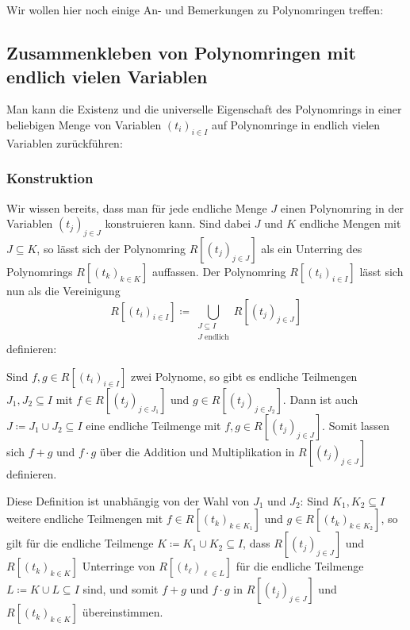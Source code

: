 \section{}

Wir wollen hier noch einige An- und Bemerkungen zu Polynomringen treffen:





\subsection*{Zusammenkleben von Polynomringen mit endlich vielen Variablen}

Man kann die Existenz und die universelle Eigenschaft des Polynomrings in einer beliebigen Menge von Variablen $(t_i)_{i \in I}$ auf Polynomringe in endlich vielen Variablen zurückführen:



\subsubsection*{Konstruktion}

Wir wissen bereits, dass man für jede endliche Menge $J$ einen Polynomring in der Variablen $(t_j)_{j \in J}$ konstruieren kann.
Sind dabei $J$ und $K$ endliche Mengen mit $J \subseteq K$, so lässt sich der Polynomring $R[(t_j)_{j \in J}]$ als ein Unterring des Polynomrings $R[(t_k)_{k \in K}]$ auffassen.
Der Polynomring $R[(t_i)_{i \in I}]$ lässt sich nun als die Vereinigung
\[
            R[(t_i)_{i \in I}]
  \coloneqq \bigcup_{\substack{J \subseteq I \\ \text{$J$ endlich}}} R[(t_j)_{j \in J}]
\]
definieren:

Sind $f, g \in R[(t_i)_{i \in I}]$ zwei Polynome, so gibt es endliche Teilmengen $J_1, J_2 \subseteq I$ mit $f \in R[(t_j)_{j \in J_1}]$ und $g \in R[(t_j)_{j \in J_2}]$.
Dann ist auch $J \coloneqq J_1 \cup J_2 \subseteq I$ eine endliche Teilmenge mit $f, g \in R[(t_j)_{j \in J}]$.
Somit lassen sich $f + g$ und $f \cdot g$ über die Addition und Multiplikation in $R[(t_j)_{j \in J}]$ definieren.

Diese Definition ist unabhängig von der Wahl von $J_1$ und $J_2$:
Sind $K_1, K_2 \subseteq I$ weitere endliche Teilmengen mit $f \in R[(t_k)_{k \in K_1}]$ und $g \in R[(t_k)_{k \in K_2}]$, so gilt für die endliche Teilmenge $K \coloneqq K_1 \cup K_2 \subseteq I$, dass $R[(t_j)_{j \in J}]$ und $R[(t_k)_{k \in K}]$ Unterringe von $R[(t_\ell)_{\ell \in L}]$ für die endliche Teilmenge $L \coloneqq K \cup L \subseteq I$ sind, und somit $f + g$ und $f \cdot g$ in $R[(t_j)_{j \in J}]$ und $R[(t_k)_{k \in K}]$ übereinstimmen.

